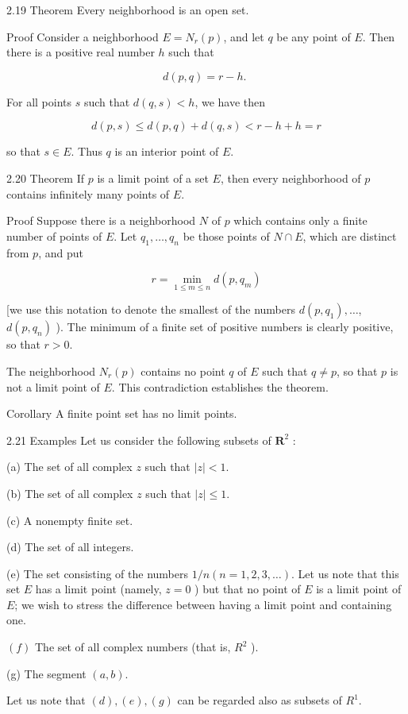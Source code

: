 \documentclass[10pt]{article}
\begin{document}
2.19 Theorem Every neighborhood is an open set.

Proof Consider a neighborhood $E=N_{r}(p)$, and let $q$ be any point of $E$. Then there is a positive real number $h$ such that

$$
d(p, q)=r-h \text {. }
$$

For all points $s$ such that $d(q, s)<h$, we have then

$$
d(p, s) \leq d(p, q)+d(q, s)<r-h+h=r
$$

so that $s \in E$. Thus $q$ is an interior point of $E$.

2.20 Theorem If $p$ is a limit point of a set $E$, then every neighborhood of $p$ contains infinitely many points of $E$.

Proof Suppose there is a neighborhood $N$ of $p$ which contains only a finite number of points of $E$. Let $q_{1}, \ldots, q_{n}$ be those points of $N \cap E$, which are distinct from $p$, and put

$$
r=\min _{1 \leq m \leq n} d\left(p, q_{m}\right)
$$

[we use this notation to denote the smallest of the numbers $d\left(p, q_{1}\right), \ldots$, $d\left(p, q_{n}\right)$ ). The minimum of a finite set of positive numbers is clearly positive, so that $r>0$.

The neighborhood $N_{r}(p)$ contains no point $q$ of $E$ such that $q \neq p$, so that $p$ is not a limit point of $E$. This contradiction establishes the theorem.

Corollary A finite point set has no limit points.

2.21 Examples Let us consider the following subsets of $\boldsymbol{R}^{2}$ :

(a) The set of all complex $z$ such that $|z|<1$.

(b) The set of all complex $z$ such that $|z| \leq 1$.

(c) A nonempty finite set.

(d) The set of all integers.

(e) The set consisting of the numbers $1 / n(n=1,2,3, \ldots)$. Let us note that this set $E$ has a limit point (namely, $z=0$ ) but that no point of $E$ is a limit point of $E$; we wish to stress the difference between having a limit point and containing one.

$(f)$ The set of all complex numbers (that is, $R^{2}$ ).

(g) The segment $(a, b)$.

Let us note that $(d),(e),(g)$ can be regarded also as subsets of $R^{1}$.
\end{document}
